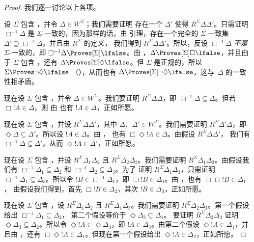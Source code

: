\documentclass[../../../include/open-logic-section]{subfiles}
\begin{document}
\begin{proof}
  我们逐一讨论以上各项。

  设 $\Sigma$ 包含 ，并令 $\Delta \in W^\Sigma$；我们需要证明
  存在一个 $\Delta'$ 使得 $R^\Sigma \Delta\Delta'$。只需证明
  $\Box^{-1}\Delta$ 是 $\Sigma$-一致的，因为那样的话，由
  引理，存在一个完全的 $\Sigma$-一致集 $\Delta' \supseteq
  \Box^{-1}\Delta$，并且由 $R^\Sigma$ 的定义，
  我们得到
  $R^\Sigma \Delta\Delta'$。所以，反设 $\Box^{-1}\Delta$ \emph{不是}
  $\Sigma$-一致的，即 $\Box^{-1}\Delta \Proves[\Sigma]
  \lfalse$。由 ，$\Delta \Proves[\Sigma]
  \Box\lfalse$，并且由于 $\Sigma$ 包含 ，还有 $\Delta
  \Proves[\Sigma] \Diamond\lfalse$。但 $\Sigma$ 是正规的，所以 $\Sigma
  \Proves \lnot\Diamond \lfalse$
  （），从而也有 $\Delta
  \Proves[\Sigma] \lnot\Diamond \lfalse$，这与~$\Delta$ 的一致性相矛盾。

  现在设 $\Sigma$ 包含 ，并令 $\Delta \in W^\Sigma$。我们要证明
  $R^\Sigma \Delta\Delta$，即
  $\Box^{-1}\Delta \subseteq \Delta$。但若 $\Box!A \in \Delta$，则
  由  也有 $!A \in \Delta$，正如所愿。

  现在设 $\Sigma$ 包含 ，并设 $R^\Sigma \Delta\Delta'$，其中
  $\Delta$、$\Delta' \in W^\Sigma$。我们需要证明 $R^\Sigma
  \Delta'\Delta$，即
  $\Diamond\Delta \subseteq \Delta'$。所以设 $!A \in \Delta$。由 ，
  也有 $\Box\Diamond!A \in \Delta$。由假设 $R^\Sigma
  \Delta\Delta'$，
  我们有 $\Box^{-1}\Delta \subseteq \Delta'$，从而 $\Diamond!A \in
  \Delta'$，正如所愿。

  现在设 $\Sigma$ 包含 ，并设 $R^\Sigma \Delta_1\Delta_2$ 且
  $R^\Sigma \Delta_2\Delta_3$。我们需要证明 $R^\Sigma
  \Delta_1\Delta_3$。由假设我们有 $\Box^{-1}\Delta_1
  \subseteq \Delta_2$ 和 $\Box^{-1}\Delta_2 \subseteq \Delta_3$。为了
  证明 $R^\Sigma \Delta_1\Delta_3$，只需证明 $\Box^{-1}\Delta_1
  \subseteq \Delta_3$。所以令 $!B \in \Box^{-1}\Delta_1$，即
  $\Box!B \in \Delta_1$。由 ，也有 $\Box\Box!B \in \Delta_1$，
  由假设我们得到，首先 $\Box!B \in \Delta_2$，其次 $!B \in
  \Delta_3$，正如所愿。

  现在设 $\Sigma$ 包含 ，设 $R^\Sigma \Delta_1\Delta_2$ 且
  $R^\Sigma \Delta_1\Delta_3$。我们需要证明 $R^\Sigma
  \Delta_2\Delta_3$。第一个假设给出 $\Box^{-1}\Delta_1 \subseteq
  \Delta_2$，
  第二个假设等价于 $\Diamond\Delta_3 \subseteq
  \Delta_1$。
  要证明 $R^\Sigma \Delta_2\Delta_3$
  证明 $\Diamond\Delta_3 \subseteq \Delta_2$。所以令 $\Diamond!A \in
  \Diamond\Delta_3$，即 $!A \in \Delta_3$。由第二个假设
  $\Diamond!A \in \Delta_1$，并且由 ，还有 $\Box\Diamond!A \in
  \Delta_1$。但现在第一个假设给出 $\Diamond!A \in \Delta_2$，正如所愿。
  \end{proof}
\end{document}
